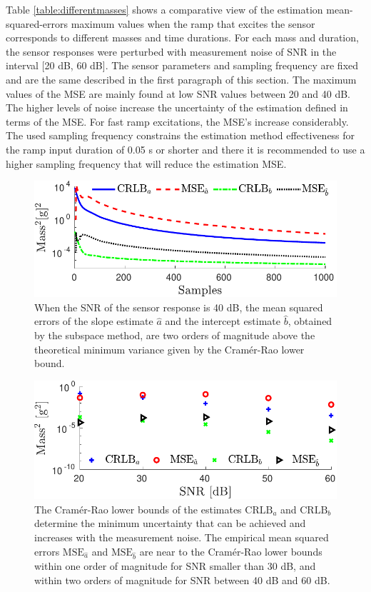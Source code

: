 Table \ref{table:differentmasses} shows a comparative view of the estimation mean-squared-errors maximum values when the ramp that excites the sensor corresponds to different masses and time durations. 
For each mass and duration, the sensor responses were perturbed with measurement noise of SNR in the interval [20 dB, 60 dB].
The sensor parameters and sampling frequency are fixed and are the same described in the first paragraph of this section.
The maximum values of the MSE are mainly found at low SNR values between 20 and 40 dB.
The higher levels of noise increase the uncertainty of the estimation defined in terms of the MSE.
For fast ramp excitations, the MSE's increase considerably.
The used sampling frequency constrains the estimation method effectiveness for the ramp input duration of 0.05 s or shorter and there it is recommended to use  a higher sampling frequency that will reduce the estimation MSE.


\begin{figure}[!htbp]
\centering
\includegraphics[width=0.69\columnwidth]{./ChapterRampInput/fig/Fig_5.pdf} 
\caption{ \label{fig:CRLB_MSE_ab_dd_40dB_MC_10000} When the SNR of the sensor response is 40 dB, the mean squared errors of the slope estimate $\widehat{a}$ and the intercept estimate $\widehat{b}$, obtained by the subspace method, are two orders of magnitude above the theoretical minimum variance given by the Cram\'er-Rao lower bound.}
\end{figure}


\begin{figure}[!htbp]
\centering
\includegraphics[width=0.69\columnwidth]{./ChapterRampInput/fig/Fig_6.pdf} 
\caption{ \label{fig:CRLB_MSE_SNR_ab_dd_MC_10000} The Cram\'er-Rao lower bounds of the estimates $\mathrm{CRLB}_a$ and $\mathrm{CRLB}_b$ determine the minimum uncertainty that can be achieved and increases with the measurement noise. 
The empirical mean squared errors $\mathrm{MSE}_{\hat{a}}$ and $\mathrm{MSE}_{\hat{b}}$ are near to the Cram\'er-Rao lower bounds within one order of magnitude for SNR smaller than 30 dB, and within two orders of magnitude for SNR between 40 dB and 60 dB. }
\end{figure}



